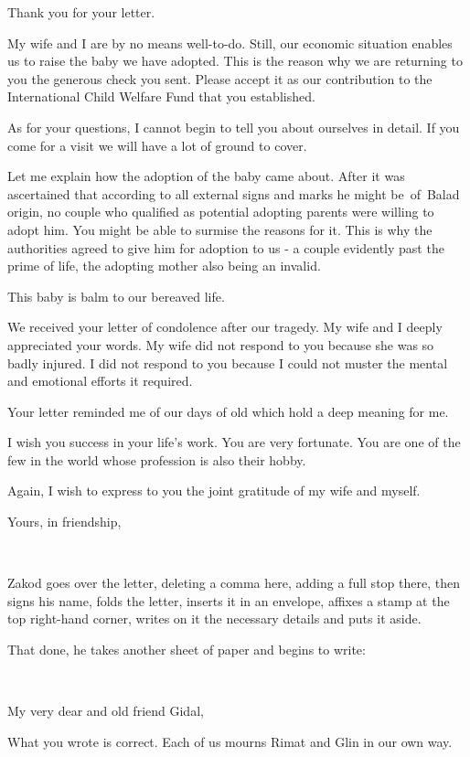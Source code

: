 \documentclass[letterpaper]{article}
\begin{document}
Thank you for your letter. 

My wife and I are by no means well-to-do. Still, our economic situation enables us to raise the baby we have adopted.
This is the reason why we are returning to you the generous check you sent. Please accept it as our contribution to the
International Child Welfare Fund that you established.

As for your questions, I cannot begin to tell you about ourselves in detail. If you come for a visit we will have a lot
of ground to cover.

Let me explain how the adoption of the baby came about. After it was ascertained that according to all external signs
and marks he might be~of~Balad origin, no couple who qualified as potential adopting parents were willing to adopt him.
You might be able to surmise the reasons for it. This is why the authorities agreed to give him for adoption to us - a
couple evidently past the prime of life, the adopting mother also being an invalid.

This baby is balm to our bereaved life.

We received your letter of condolence after our tragedy. My wife and I deeply appreciated your words. My wife did not
respond to you because she was so badly injured. I did not respond to you because I could not muster the mental and
emotional efforts it required.

Your letter reminded me of our days of old which hold a deep meaning for me.

I wish you success in your life's work. You are very fortunate. You are one of the few in the world whose profession is
also their hobby.

Again, I wish to express to you the joint gratitude of my wife and myself.

Yours, in friendship,

~

Zakod goes over the letter, deleting a comma here, adding a full stop there, then signs his name, folds the letter,
inserts it in an envelope, affixes a stamp at the top right-hand corner, writes on it the necessary details and puts it
aside.

That done, he takes another sheet of paper and begins to write:

~

My very dear and old friend Gidal,

What you wrote is correct. Each of us mourns Rimat and Glin in our own way.
\end{document}
